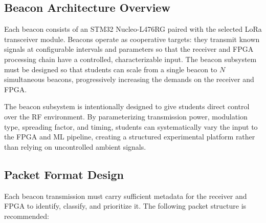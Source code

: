 \documentclass[11pt,letterpaper]{article}
\begin{document}
	\subsection{Beacon Architecture Overview}
	
	Each beacon consists of an STM32 Nucleo-L476RG paired with the selected LoRa transceiver module. Beacons operate as cooperative targets: they transmit known signals at configurable intervals and parameters so that the receiver and FPGA processing chain have a controlled, characterizable input. The beacon subsystem must be designed so that students can scale from a single beacon to $N$ simultaneous beacons, progressively increasing the demands on the receiver and FPGA.
	
	\begin{tcolorbox}[infobox={Design Principle: Controlled Complexity}]
		The beacon subsystem is intentionally designed to give students direct control over the RF environment. By parameterizing transmission power, modulation type, spreading factor, and timing, students can systematically vary the input to the FPGA and ML pipeline, creating a structured experimental platform rather than relying on uncontrolled ambient signals.
	\end{tcolorbox}
	
	\subsection{Packet Format Design}
	
	Each beacon transmission must carry sufficient metadata for the receiver and FPGA to identify, classify, and prioritize it. The following packet structure is recommended:
	
\end{document}
